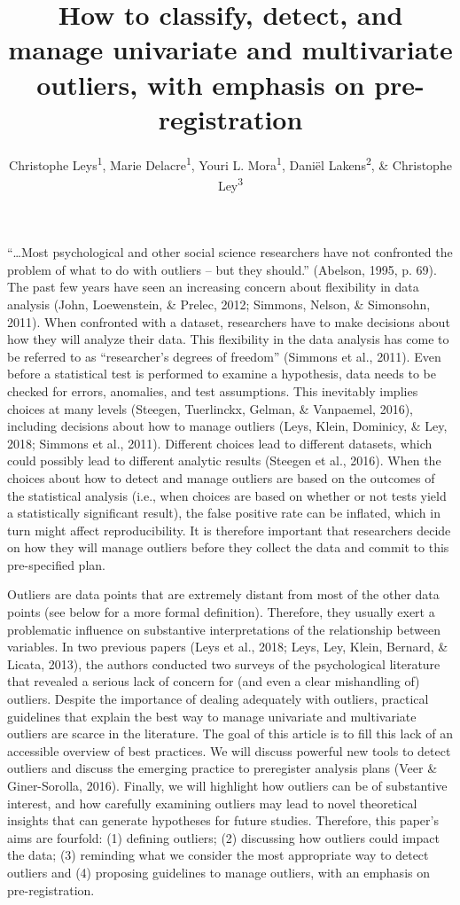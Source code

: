 \documentclass[man,floatsintext]{apa6}
\title{How to classify, detect, and manage univariate and multivariate outliers, with emphasis on pre-registration}
\author{Christophe Leys\textsuperscript{1}, Marie Delacre\textsuperscript{1}, Youri L. Mora\textsuperscript{1}, Daniël Lakens\textsuperscript{2}, \& Christophe Ley\textsuperscript{3}}
\date{}
\affiliation{
\vspace{0.5cm}
\textsuperscript{1} Université Libre de Bruxelles, Service of Analysis of the Data (SAD), Bruxelles, Belgium\\\textsuperscript{2} Eindhoven University of Technology, Human Technology Interaction Group, Eindhoven, the Netherlands\\\textsuperscript{3} Universiteit Gent, Department of Applied Mathematics, Computer Science and Statistics, Gent, Belgium}
\begin{document}
\maketitle

\enquote{\ldots{}Most psychological and other social science researchers have not confronted the problem of what to do with outliers -- but they should.} (Abelson, 1995, p. 69). The past few years have seen an increasing concern about flexibility in data analysis (John, Loewenstein, \& Prelec, 2012; Simmons, Nelson, \& Simonsohn, 2011). When confronted with a dataset, researchers have to make decisions about how they will analyze their data. This flexibility in the data analysis has come to be referred to as \enquote{researcher's degrees of freedom} (Simmons et al., 2011). Even before a statistical test is performed to examine a hypothesis, data needs to be checked for errors, anomalies, and test assumptions. This inevitably implies choices at many levels (Steegen, Tuerlinckx, Gelman, \& Vanpaemel, 2016), including decisions about how to manage outliers (Leys, Klein, Dominicy, \& Ley, 2018; Simmons et al., 2011). Different choices lead to different datasets, which could possibly lead to different analytic results (Steegen et al., 2016). When the choices about how to detect and manage outliers are based on the outcomes of the statistical analysis (i.e., when choices are based on whether or not tests yield a statistically significant result), the false positive rate can be inflated, which in turn might affect reproducibility. It is therefore important that researchers decide on how they will manage outliers before they collect the data and commit to this pre-specified plan.

Outliers are data points that are extremely distant from most of the other data points (see below for a more formal definition). Therefore, they usually exert a problematic influence on substantive interpretations of the relationship between variables. In two previous papers (Leys et al., 2018; Leys, Ley, Klein, Bernard, \& Licata, 2013), the authors conducted two surveys of the psychological literature that revealed a serious lack of concern for (and even a clear mishandling of) outliers. Despite the importance of dealing adequately with outliers, practical guidelines that explain the best way to manage univariate and multivariate outliers are scarce in the literature. The goal of this article is to fill this lack of an accessible overview of best practices. We will discuss powerful new tools to detect outliers and discuss the emerging practice to preregister analysis plans (Veer \& Giner-Sorolla, 2016). Finally, we will highlight how outliers can be of substantive interest, and how carefully examining outliers may lead to novel theoretical insights that can generate hypotheses for future studies. Therefore, this paper's aims are fourfold: (1) defining outliers; (2) discussing how outliers could impact the data; (3) reminding what we consider the most appropriate way to detect outliers and (4) proposing guidelines to manage outliers, with an emphasis on pre-registration.
\end{document}
